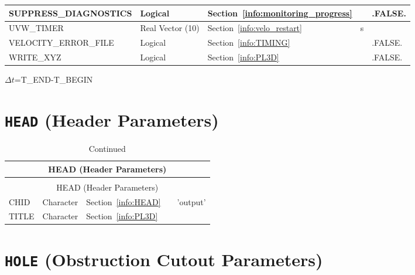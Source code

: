 \documentclass[11pt]{book}
\begin{document}
\begin{longtable}{@{\extracolsep{\fill}}|l|l|l|l|l|}
{\ct SUPPRESS\_DIAGNOSTICS}         & Logical      & Section~\ref{info:monitoring_progress} &           & {\ct .FALSE.}                  \\ \hline
{\ct UVW\_TIMER}                    & Real Vector (10)  & Section~\ref{info:velo_restart}   &  s        &                                \\ \hline
{\ct VELOCITY\_ERROR\_FILE}         & Logical      & Section~\ref{info:TIMING}              &           & {\ct .FALSE.}                  \\ \hline
{\ct WRITE\_XYZ}                    & Logical      & Section~\ref{info:PL3D}                &           & {\ct .FALSE.}                  \\ \hline
\end{longtable}

\noindent
$\Delta t$={\ct T\_END-T\_BEGIN}

\vspace{\baselineskip}

\section{\texorpdfstring{{\tt HEAD}}{HEAD} (Header Parameters)}


\begin{longtable}{@{\extracolsep{\fill}}|l|l|l|l|l|}
\caption[Header parameters ({\ct HEAD} namelist group)]{For more information see Section~\ref{info:HEAD}.}
\label{tbl:HEAD} \\
\hline
\multicolumn{5}{|c|}{{\ct HEAD} (Header Parameters)} \\
\hline \hline
\endfirsthead
\caption[]{Continued} \\
\hline
\multicolumn{5}{|c|}{{\ct HEAD} (Header Parameters)} \\
\hline \hline
\endhead
{\ct CHID}      & Character   & Section~\ref{info:HEAD}     &           & {\ct 'output'}    \\ \hline
{\ct TITLE}     & Character   & Section~\ref{info:PL3D}     &           &                   \\ \hline
\end{longtable}

\vspace{\baselineskip}


\section{\texorpdfstring{{\tt HOLE}}{HOLE} (Obstruction Cutout Parameters)}
\end{document}
